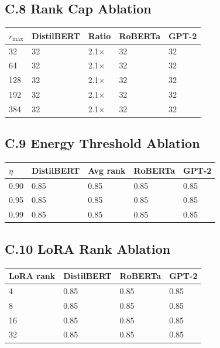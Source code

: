 \subsection{C.8 Rank Cap Ablation}

\begin{table}[H]
\centering
\small
\begin{tabular}{lllll}
\toprule
\textbf{$r_\text{max}$} & \textbf{DistilBERT} & \textbf{Ratio} & \textbf{RoBERTa} & \textbf{GPT-2} \\
\midrule
32 & 32 & 2.1$\times$ & 32 & 32 \\
64 & 32 & 2.1$\times$ & 32 & 32 \\
128 & 32 & 2.1$\times$ & 32 & 32 \\
192 & 32 & 2.1$\times$ & 32 & 32 \\
384 & 32 & 2.1$\times$ & 32 & 32 \\
\bottomrule
\end{tabular}
\end{table}

\subsection{C.9 Energy Threshold Ablation}

\begin{table}[H]
\centering
\small
\begin{tabular}{lllll}
\toprule
\textbf{$\eta$} & \textbf{DistilBERT} & \textbf{Avg rank} & \textbf{RoBERTa} & \textbf{GPT-2} \\
\midrule
0.90 & 0.85 & 0.85 & 0.85 & 0.85 \\
0.95 & 0.85 & 0.85 & 0.85 & 0.85 \\
0.99 & 0.85 & 0.85 & 0.85 & 0.85 \\
\bottomrule
\end{tabular}
\end{table}

\subsection{C.10 LoRA Rank Ablation}

\begin{table}[H]
\centering
\small
\begin{tabular}{llll}
\toprule
\textbf{LoRA rank} & \textbf{DistilBERT} & \textbf{RoBERTa} & \textbf{GPT-2} \\
\midrule
4 & 0.85 & 0.85 & 0.85 \\
8 & 0.85 & 0.85 & 0.85 \\
16 & 0.85 & 0.85 & 0.85 \\
32 & 0.85 & 0.85 & 0.85 \\
\bottomrule
\end{tabular}
\end{table}

